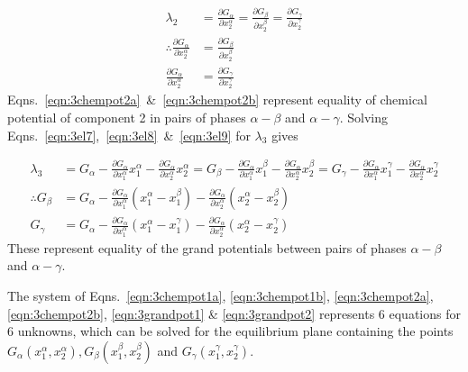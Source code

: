 \documentclass[10pt]{article}
\begin{document}
\begin{align}
  \lambda_2 &= \frac{\partial G_{\alpha}}{\partial x_2^{\alpha}}
             = \frac{\partial G_{\beta}}{\partial x_2^{\beta}}
             = \frac{\partial G_{\gamma}}{\partial x_2^{\gamma}}\\
  \label{eqn:3chempot2a}
  \therefore \frac{\partial G_{\alpha}}{\partial x_2^{\alpha}}
          &= \frac{\partial G_{\beta}}{\partial x_2^{\beta}}\\
  \label{eqn:3chempot2b}
             \frac{\partial G_{\alpha}}{\partial x_2^{\alpha}}
          &= \frac{\partial G_{\gamma}}{\partial x_2^{\gamma}}
\end{align}
Eqns.~\ref{eqn:3chempot2a}~\&~\ref{eqn:3chempot2b} represent equality of
chemical potential of component 2 in pairs of phases $\alpha-\beta$ and
$\alpha-\gamma$. Solving Eqns.~\ref{eqn:3el7},~\ref{eqn:3el8}~\&~\ref{eqn:3el9}
for $\lambda_3$ gives

\begin{align}
  \lambda_3 &= G_{\alpha}
             - \frac{\partial G_{\alpha}}{\partial x_1^{\alpha}} x_1^{\alpha}
             - \frac{\partial G_{\alpha}}{\partial x_2^{\alpha}} x_2^{\alpha}
             = G_{\beta}
             - \frac{\partial G_{\alpha}}{\partial x_1^{\alpha}} x_1^{\beta}
             - \frac{\partial G_{\alpha}}{\partial x_2^{\alpha}} x_2^{\beta}
             = G_{\gamma}
             - \frac{\partial G_{\alpha}}{\partial x_1^{\alpha}} x_1^{\gamma}
             - \frac{\partial G_{\alpha}}{\partial x_2^{\alpha}} x_2^{\gamma}\\
  \label{eqn:3grandpot1}
  \therefore G_{\beta} &= G_{\alpha}
             - \frac{\partial G_{\alpha}}{\partial x_1^{\alpha}}(x_1^{\alpha} - x_1^{\beta})
             - \frac{\partial G_{\alpha}}{\partial x_2^{\alpha}}(x_2^{\alpha} - x_2^{\beta})\\
  \label{eqn:3grandpot2}
  G_{\gamma} &= G_{\alpha}
              - \frac{\partial G_{\alpha}}{\partial x_1^{\alpha}}(x_1^{\alpha} - x_1^{\gamma})
              - \frac{\partial G_{\alpha}}{\partial x_2^{\alpha}}(x_2^{\alpha} - x_2^{\gamma})
\end{align}
These represent equality of the grand potentials between pairs of phases $\alpha-\beta$ and
$\alpha-\gamma$.

The system of Eqns.~\ref{eqn:3chempot1a}, \ref{eqn:3chempot1b},
\ref{eqn:3chempot2a}, \ref{eqn:3chempot2b}, \ref{eqn:3grandpot1} \&
\ref{eqn:3grandpot2} represents 6 equations for 6 unknowns, which can be solved
for the equilibrium plane containing the points
$G_{\alpha}(x_1^{\alpha},x_2^{\alpha}), G_{\beta}(x_1^{\beta},x_2^{\beta})$ and
$G_{\gamma}(x_1^{\gamma},x_2^{\gamma})$.
\end{document}
